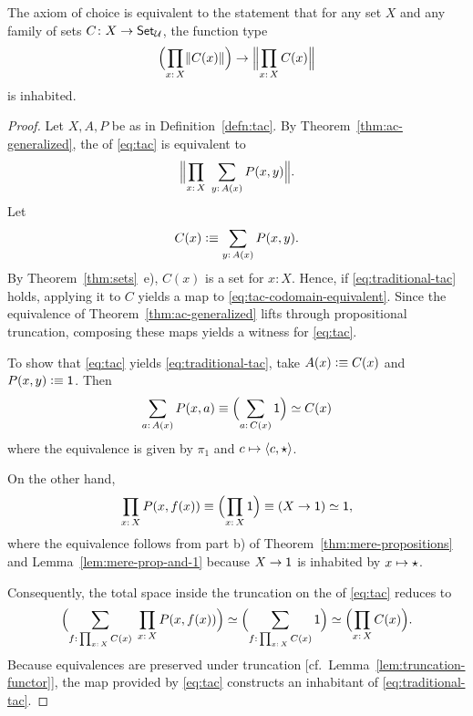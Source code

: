 \begin{lem}\fe\label{lem:traditional-tac}
    The axiom of choice is equivalent to the statement that for any set\/ $X$ and any family of sets\/ $C\colon X\to\fun{Set}_\univ$, the function type
    \begin{equation}\label{eq:traditional-tac}
        \Bigl(\prod_{x\colon X}\lVert C(x)\rVert\Bigr)
        \to
        \Bigl\lVert\prod_{x\colon X}C(x)\Bigr\rVert
    \end{equation}
    is inhabited.
\end{lem}

\begin{proof}
    Let $X,A,P$ be as in Definition~\ref{defn:tac}. By Theorem~\ref{thm:ac-generalized}, the \rhs of \eqref{eq:tac} is equivalent to
    \begin{equation}\label{eq:tac-codomain-equivalent}
        \Bigl\lVert
            \prod_{x\colon X}\;\sum_{y\colon A(x)}P(x,y)
        \Bigr\rVert.
    \end{equation}
    Let
    \[
        C(x)\defeq\sum_{y\colon A(x)}P(x,y).
    \]
    By Theorem~\ref{thm:sets}~e), $C(x)$ is a set for $x\colon X$. Hence, if \eqref{eq:traditional-tac} holds, applying it to $C$ yields a map to \eqref{eq:tac-codomain-equivalent}. Since the equivalence of Theorem~\ref{thm:ac-generalized} lifts through propositional truncation, composing these maps yields a witness for \eqref{eq:tac}.

    To show that \eqref{eq:tac} yields \eqref{eq:traditional-tac}, take $A(x)\mathrel{\vcentcolon}\equiv C(x)$ and $P(x,y)\mathrel{\vcentcolon}\equiv\mathsf{1}$. Then
    \[
        \sum_{a\colon A(x)}P(x,a)
            \equiv\Bigl(\sum_{a\colon C(x)}\fun1\Bigr)
            \simeq C(x)
    \]
    where the equivalence is given by $\pi_1$ and $c\mapsto\langle c,\mathsf{\star}\rangle$. 

    On the other hand,
    \[
        \prod_{x\colon X}P(x,f(x))
            \equiv\Bigl(\prod_{x\colon X}\fun1\Bigr)
            \equiv(X\to\fun1)
            \simeq\fun1,
    \]
    where the equivalence follows from part b) of Theorem~\ref{thm:mere-propositions} and Lemma~\ref{lem:mere-prop-and-1} because $X\to\mathsf{1}$ is inhabited by $x\mapsto\mathsf{\star}$.
    
    Consequently, the total space inside the truncation on the \rhs of \eqref{eq:tac} reduces to
    \[
        \Bigl(
            \sum_{f\colon\prod_{x\colon X}C(x)}\;\prod_{x\colon X}P(x,f(x))
        \Bigr)
        \simeq
        \Bigl(
            \sum_{f\colon\prod_{x\colon X}C(x)}\fun1
        \Bigr)
        \simeq
        \Bigl(
            \prod_{x\colon X}C(x)
        \Bigr).
    \]
    Because equivalences are preserved under truncation [cf.~Lemma~\ref{lem:truncation-functor}], the map provided by \eqref{eq:tac} constructs an inhabitant of \eqref{eq:traditional-tac}.
\end{proof}


